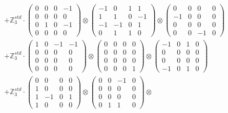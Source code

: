 \documentclass{article}
\begin{document}
{\begin{align}
    &+ \label{Rs12-Rc12-Solution-Transformed-c15} \mathbb{Z}_3^{std} \cdot 
        \begin{pmatrix} 0 & 0 & 0 & -1 \\ 0 & 0 & 0 & 0 \\ 0 & 1 & 0 & -1 \\ 0 & 0 & 0 & 0 \end{pmatrix} \otimes 
        \begin{pmatrix} -1 & 0 & 1 & 1 \\ 1 & 1 & 0 & -1 \\ -1 & -1 & 0 & 1 \\ 0 & 1 & 1 & 0 \end{pmatrix} \otimes 
        \begin{pmatrix} 0 & 0 & 0 & 0 \\ -1 & 0 & 0 & 0 \\ 0 & 0 & 0 & 0 \\ 0 & 0 & -1 & 0 \end{pmatrix} \\ 
    &+ \label{Rs12-Rc12-Solution-Transformed-c16} \mathbb{Z}_3^{std} \cdot 
        \begin{pmatrix} 1 & 0 & -1 & -1 \\ 0 & 0 & 0 & 0 \\ 0 & 0 & 0 & 0 \\ 0 & 0 & 0 & 0 \end{pmatrix} \otimes 
        \begin{pmatrix} 0 & 0 & 0 & 0 \\ 0 & 0 & 0 & 0 \\ 0 & 0 & 0 & 0 \\ 0 & 0 & 0 & 1 \end{pmatrix} \otimes 
        \begin{pmatrix} -1 & 0 & 1 & 0 \\ 0 & 0 & 0 & 0 \\ 0 & 0 & 0 & 0 \\ -1 & 0 & 1 & 0 \end{pmatrix} \\ 
    &+ \label{Rs12-Rc12-Solution-Transformed-c17} \mathbb{Z}_3^{std} \cdot 
        \begin{pmatrix} 0 & 0 & 0 & 0 \\ 1 & 0 & 0 & 0 \\ 1 & -1 & 0 & 1 \\ 1 & 0 & 0 & 0 \end{pmatrix} \otimes 
        \begin{pmatrix} 0 & 0 & -1 & 0 \\ 0 & 0 & 0 & 0 \\ 0 & 0 & 0 & 0 \\ 0 & 1 & 1 & 0 \end{pmatrix} \otimes 

\end{align}}
\end{document}
